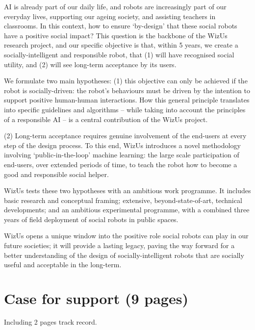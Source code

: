 \documentclass[11pt,a4paper]{report}
\newcommand{\project}{WizUs\xspace}
\begin{document}
AI is already part of our daily life, and robots are increasingly part of our
everyday lives, supporting our ageing society, and assisting teachers in
classrooms. In this context, how to ensure `by-design' that these social robots
have a positive social impact? This question is the backbone of the \project
research project, and our specific objective is that, within 5 years, we create
a socially-intelligent and responsible robot, that (1) will have recognised
social utility, and (2) will see long-term acceptance by its users.

We formulate two main hypotheses: (1) this objective can only be achieved if the
robot is socially-driven: the robot's behaviours must be driven by the intention
to support positive human-human interactions. How this general principle
translates into specific guidelines and algorithms -- while taking into account
the principles of a responsible AI -- is a central contribution of the \project
project.

(2) Long-term acceptance requires genuine involvement of the end-users at every
step of the design process. To this end, \project introduces a novel methodology
involving `public-in-the-loop' machine learning: the large scale participation
of end-users, over extended periods of time, to teach the robot how to become a
good and responsible social helper.

\project tests these two hypotheses with an ambitious work programme. It includes
basic research and conceptual framing; extensive, beyond-state-of-art, technical
developments; and an ambitious experimental programme, with a combined three
years of field deployment of social robots in public spaces.

\project opens a unique window into the positive role social robots can play in our
future societies; it will provide a lasting legacy, paving the way forward for a
better understanding of the design of socially-intelligent robots that are
socially useful and acceptable in the long-term.




\newpage


\pagebreak

\chapter{Case for support (9 pages)}

Including 2 pages track record.
\end{document}
